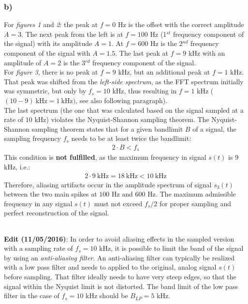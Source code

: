 \documentclass[
a4paper, 
12pt, 
]{article}
\begin{document}
\subsubsection*{b)}
For \textit{figures 1} and \textit{2}: the peak at $f = 0$ Hz is the offset with the correct amplitude $A = 3$. The next peak from the left is at $f = 100$ Hz (1$^{st}$ frequency component of the signal) with its amplitude $A = 1$. At $f=600$ Hz is the 2$^{nd}$ frequency component of the signal with $A = 1.5$. The last peak at $f=9$ kHz with an amplitude of $A=2$ is the 3$^{rd}$ frequency component of the signal.\\
For \textit{figure 3}, there is no peak at $f=9$ kHz, but an additional peak at $f=1$ kHz. That peak was shifted from the \textit{left-side spectrum}, as the FFT spectrum initially was symmetric, but only by $f_s=10$ kHz, thus resulting in $f=1$ kHz ($(10-9)~\text{kHz} = 1~\text{kHz})$, see also following paragraph).\\ 
The last spectrum (the one that was calculated based on the signal sampled at a rate of $10$ kHz) violates the Nyquist-Shannon sampling theorem. The Nyquist-Shannon sampling theorem states that for a given bandlimit $B$ of a signal, the sampling frequency $f_s$ needs to be at least twice the bandlimit:
\begin{align}
2\cdot B < f_s
\end{align}
This condition is \textbf{not fulfilled}, as the maximum frequency in signal $s(t)$ is $9$ kHz, i.e.:
\begin{align}
2\cdot 9~\text{kHz} = 18~\text{kHz} < 10~\text{kHz}
\end{align}
Therefore, aliasing artifacts occur in the amplitude spectrum of signal $s_3(t)$ between the two main spikes at $100$ Hz and $600$ Hz. The maximum admissible frequency in any signal $s(t)$ must not exceed $f_s/2$ for proper sampling and perfect reconstruction of the signal.\\\\

\begin{tcolorbox}
	\large{\textbf{Edit (11/05/2016)}: In order to avoid aliasing effects in the sampled version with a sampling rate of $f_s = 10$ kHz, it is possible to limit the band of the signal by using an \textit{anti-aliasing filter}. An anti-aliasing filter can typically be realized with a low pass filter and needs to applied to the original, analog signal $s(t)$ before sampling. That filter ideally needs to have very steep edges, so that the signal within the Nyquist limit is not distorted. The band limit of the low pass filter in the case of $f_s=10$ kHz should be $B_{LP}=5$ kHz.}
\end{tcolorbox}


	
\end{document}
